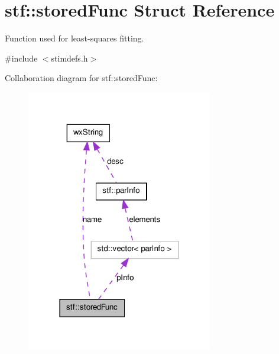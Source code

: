\hypertarget{structstf_1_1storedFunc}{
\section{stf::storedFunc Struct Reference}
\label{structstf_1_1storedFunc}
}


Function used for least-\/squares fitting.  




{\ttfamily \#include $<$stimdefs.h$>$}



Collaboration diagram for stf::storedFunc:
\nopagebreak
\begin{figure}[H]
\begin{center}
\leavevmode
\includegraphics[width=230pt]{structstf_1_1storedFunc__coll__graph}
\end{center}
\end{figure}
